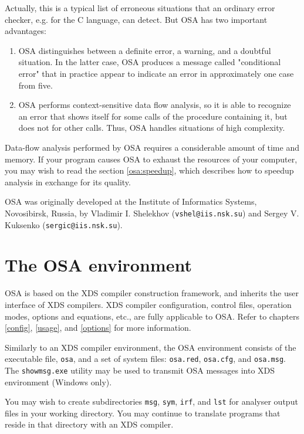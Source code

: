 Actually, this is a typical list of erroneous situations that an ordinary
error checker, e.g. for the C language, can detect. But OSA has two
important advantages:
\begin{enumerate}
\item OSA distinguishes between a definite error, a warning, and a
      doubtful situation. In the latter case, OSA produces a message called 
      "conditional error" that in practice appear to indicate an error
      in approximately one case from five.

\item OSA performs context-sensitive data flow analysis, so it is able to
      recognize an error that shows itself for some calls of the 
      procedure containing it, but does not for other calls. 
      Thus, OSA handles situations of high complexity.
\end{enumerate}

Data-flow analysis performed by OSA requires a considerable amount of
time and memory. If your program causes OSA to exhaust the resources 
of your computer, you may wish to read the section \ref{osa:speedup}, which
describes how to speedup analysis in exchange for its quality.

OSA was originally developed at the Institute of Informatics Systems,
Novosibirsk, Russia, by Vladimir I. Shelekhov (\verb'vshel@iis.nsk.su') and
Sergey V. Kuksenko (\verb'sergic@iis.nsk.su').

\section{The OSA environment}
\label{osa:env}

OSA is based on the XDS compiler construction framework,
and inherits the user interface of XDS compilers.
XDS compiler configuration, control files, operation modes,
options and equations, etc., are fully applicable to OSA.
Refer to chapters \ref{config}, \ref{usage}, and \ref{options}
for more information.

Similarly to an XDS compiler environment, the OSA environment consists of
the executable file, {\tt osa\Exe{}}, and a set of system files: 
\verb'osa.red', \verb'osa.cfg', and \verb'osa.msg'. The \verb'showmsg.exe' 
utility may be used to transmit OSA messages into XDS environment 
(Windows only).

You may wish to create subdirectories \verb'msg', \verb'sym', \verb'irf', 
and \verb'lst' for analyser output files in your working directory. 
You may continue to translate programs that reside in that directory 
with an XDS compiler.

